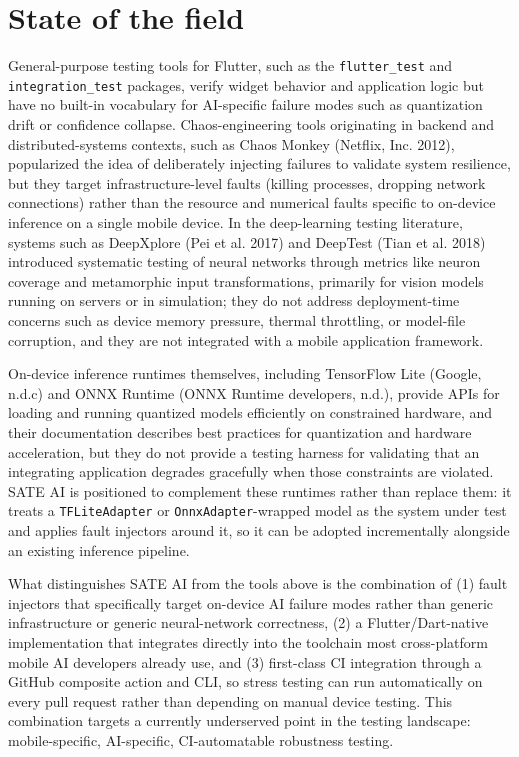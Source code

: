 \documentclass[
  11pt,
]{article}
\begin{document}
\hypertarget{state-of-the-field}{%
\section{State of the field}\label{state-of-the-field}}

General-purpose testing tools for Flutter, such as the
\texttt{flutter\_test} and \texttt{integration\_test} packages, verify
widget behavior and application logic but have no built-in vocabulary
for AI-specific failure modes such as quantization drift or confidence
collapse. Chaos-engineering tools originating in backend and
distributed-systems contexts, such as Chaos Monkey (Netflix, Inc. 2012),
popularized the idea of deliberately injecting failures to validate
system resilience, but they target infrastructure-level faults (killing
processes, dropping network connections) rather than the resource and
numerical faults specific to on-device inference on a single mobile
device. In the deep-learning testing literature, systems such as
DeepXplore (Pei et al. 2017) and DeepTest (Tian et al. 2018) introduced
systematic testing of neural networks through metrics like neuron
coverage and metamorphic input transformations, primarily for vision
models running on servers or in simulation; they do not address
deployment-time concerns such as device memory pressure, thermal
throttling, or model-file corruption, and they are not integrated with a
mobile application framework.

On-device inference runtimes themselves, including TensorFlow Lite
(Google, n.d.c) and ONNX Runtime (ONNX Runtime developers, n.d.),
provide APIs for loading and running quantized models efficiently on
constrained hardware, and their documentation describes best practices
for quantization and hardware acceleration, but they do not provide a
testing harness for validating that an integrating application degrades
gracefully when those constraints are violated. SATE AI is positioned to
complement these runtimes rather than replace them: it treats a
\texttt{TFLiteAdapter} or \texttt{OnnxAdapter}-wrapped model as the
system under test and applies fault injectors around it, so it can be
adopted incrementally alongside an existing inference pipeline.

What distinguishes SATE AI from the tools above is the combination of
(1) fault injectors that specifically target on-device AI failure modes
rather than generic infrastructure or generic neural-network
correctness, (2) a Flutter/Dart-native implementation that integrates
directly into the toolchain most cross-platform mobile AI developers
already use, and (3) first-class CI integration through a GitHub
composite action and CLI, so stress testing can run automatically on
every pull request rather than depending on manual device testing. This
combination targets a currently underserved point in the testing
landscape: mobile-specific, AI-specific, CI-automatable robustness
testing.
\end{document}
